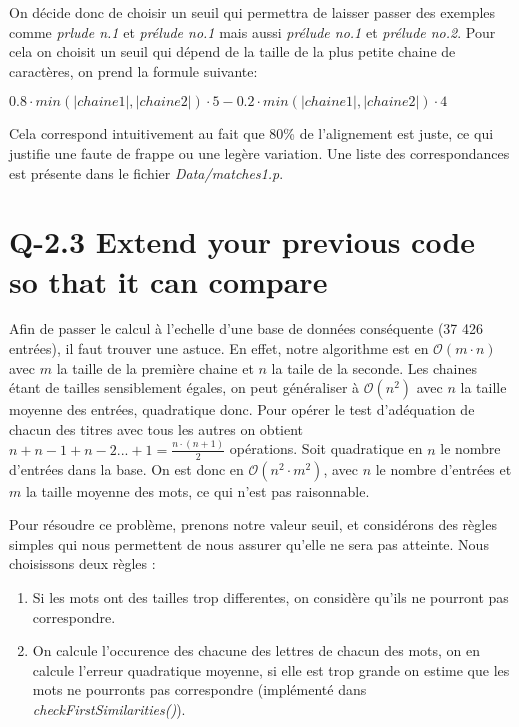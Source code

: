 \documentclass[10.5pt, oneside]{article}   	%
\begin{document}
On décide donc de choisir un seuil qui permettra de laisser passer des exemples comme \textit{prlude n.1} et \textit{prélude no.1} mais aussi \textit{prélude no.1} et \textit{prélude no.2}. Pour cela on choisit un seuil qui dépend de la taille de la plus petite chaine de caractères, on prend la formule suivante: 
\begin{center}
	$0.8\cdot min(|chaine1|, |chaine2|)\cdot 5 - 0.2\cdot min(|chaine1|, |chaine2|)\cdot 4$
\end{center}

Cela correspond intuitivement au fait que 80\% de l'alignement est juste, ce qui justifie une faute de frappe ou une legère variation. Une liste des correspondances est présente dans le fichier \textit{Data/matches1.p}.

\section{Q-2.3 Extend your previous code so that it can compare}

Afin de passer le calcul à l'echelle d'une base de données conséquente (37 426 entrées), il faut trouver une astuce. En effet, notre algorithme est en $\mathcal{O}(m \cdot n)$ avec $m$ la taille de la première chaine et $n$ la taile de la seconde. Les chaines étant de tailles sensiblement égales, on peut généraliser à $\mathcal{O}(n^2)$ avec $n$ la taille moyenne des entrées, quadratique donc. Pour opérer le test d'adéquation de chacun des titres avec tous les autres on obtient $n + n-1 + n-2 ... + 1 = \frac{n \cdot (n+1)}{2}$ opérations. Soit quadratique en $n$ le nombre d'entrées dans la base. On est donc en $\mathcal{O}(n^2 \cdot m^2)$, avec $n$ le nombre d'entrées et $m$ la taille moyenne des mots, ce qui n'est pas raisonnable.

Pour résoudre ce problème, prenons notre valeur seuil, et considérons des règles simples qui nous permettent de nous assurer qu'elle ne sera pas atteinte. Nous choisissons deux règles : 
\begin{enumerate}
	\item Si les mots ont des tailles trop differentes, on considère qu'ils ne pourront pas correspondre.
	\item On calcule l'occurence des chacune des lettres de chacun des mots, on en calcule l'erreur quadratique moyenne, si elle est trop grande on estime que les mots ne pourronts pas correspondre (implémenté dans \textit{checkFirstSimilarities()}).
\end{enumerate}
\end{document}
